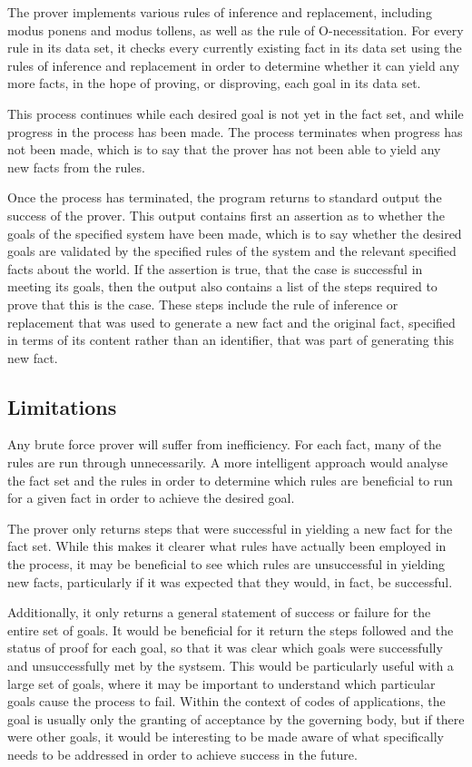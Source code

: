 \documentclass{l4proj}
\begin{document}
The prover implements various rules of inference and replacement, including modus ponens and modus tollens, as well as the rule of O-necessitation. For every rule in its data set, it checks every currently existing fact in its data set using the rules of inference and replacement in order to determine whether it can yield any more facts, in the hope of proving, or disproving, each goal in its data set. 

This process continues while each desired goal is not yet in the fact set, and while progress in the process has been made. The process terminates when progress has not been made, which is to say that the prover has not been able to yield any new facts from the rules. 

Once the process has terminated, the program returns to standard output the success of the prover. This output contains first an assertion as to whether the goals of the specified system have been made, which is to say whether the desired goals are validated by the specified rules of the system and the relevant specified facts about the world. If the assertion is true, that the case is successful in meeting its goals, then the output also contains a list of the steps required to prove that this is the case. These steps include the rule of inference or replacement that was used to generate a new fact and the original fact, specified in terms of its content rather than an identifier, that was part of generating this new fact. 

\subsection{Limitations}
Any brute force prover will suffer from inefficiency. For each fact, many of the rules are run through unnecessarily. A more intelligent approach would analyse the fact set and the rules in order to determine which rules are beneficial to run for a given fact in order to achieve the desired goal. 

The prover only returns steps that were successful in yielding a new fact for the fact set. While this makes it clearer what rules have actually been employed in the process, it may be beneficial to see which rules are unsuccessful in yielding new facts, particularly if it was expected that they would, in fact, be successful. 

Additionally, it only returns a general statement of success or failure for the entire set of goals. It would be beneficial for it return the steps followed and the status of proof for each goal, so that it was clear which goals were successfully and unsuccessfully met by the systsem. This would be particularly useful with a large set of goals, where it may be important to understand which particular goals cause the process to fail. Within the context of codes of applications, the goal is usually only the granting of acceptance by the governing body, but if there were other goals, it would be interesting to be made aware of what specifically needs to be addressed in order to achieve success in the future. 
\end{document}
